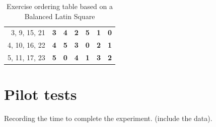 \begin{table}[]
{\begin{tabular}{rcccccc}
\multicolumn{1}{r|}{3, 9, 15, 21} & \multicolumn{1}{c|}{\textbf{3}} & \multicolumn{1}{c|}{\textbf{4}} & \multicolumn{1}{c|}{\textbf{2}} & \multicolumn{1}{c|}{\textbf{5}} & \multicolumn{1}{c|}{\textbf{1}} & \multicolumn{1}{c|}{\textbf{0}} \\ \cline{2-7} 
\multicolumn{1}{r|}{4, 10, 16, 22} & \multicolumn{1}{c|}{\textbf{4}} & \multicolumn{1}{c|}{\textbf{5}} & \multicolumn{1}{c|}{\textbf{3}} & \multicolumn{1}{c|}{\textbf{0}} & \multicolumn{1}{c|}{\textbf{2}} & \multicolumn{1}{c|}{\textbf{1}} \\ \cline{2-7} 
\multicolumn{1}{r|}{5, 11, 17, 23} & \multicolumn{1}{c|}{\textbf{5}} & \multicolumn{1}{c|}{\textbf{0}} & \multicolumn{1}{c|}{\textbf{4}} & \multicolumn{1}{c|}{\textbf{1}} & \multicolumn{1}{c|}{\textbf{3}} & \multicolumn{1}{c|}{\textbf{2}} \\ \cline{2-7} 
\end{tabular}%
}
\caption{Exercise ordering table based on a Balanced Latin Square}
\label{latin}
\end{table}









\section{Pilot tests}
Recording the time to complete the experiment. (include the data).








